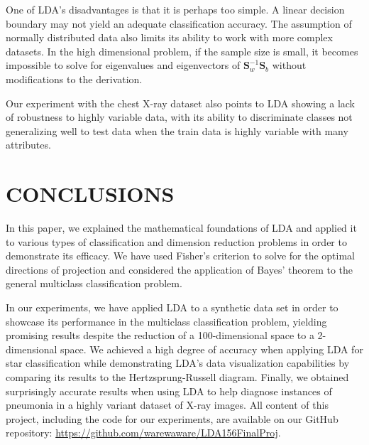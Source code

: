\documentclass[letterpaper, 10 pt, conference]{ieeeconf}  %
\newcommand{\ve}[1]{\mathbf{#1}}
\begin{document}
One of LDA's disadvantages is that it is perhaps too simple. A linear decision boundary may not yield an adequate classification accuracy. The assumption of normally distributed data also limits its ability to work with more complex datasets. In the high dimensional problem, if the sample size is small, it becomes impossible to solve for eigenvalues and eigenvectors of $\ve{S}_w^{-1}\ve{S}_b$ without modifications to the derivation.

Our experiment with the chest X-ray dataset also points to LDA showing a lack of robustness to highly variable data, with its ability to discriminate classes not generalizing well to test data when the train data is highly variable with many attributes.

\section{CONCLUSIONS}\label{sec:conclusions}
In this paper, we explained the mathematical foundations of LDA and applied it to various types of classification and dimension reduction problems in order to demonstrate its efficacy. We have used Fisher's criterion to solve for the optimal directions of projection and considered the application of Bayes' theorem to the general multiclass classification problem.

In our experiments, we have applied LDA to a synthetic data set in order to showcase its performance in the multiclass classification problem, yielding promising results despite the reduction of a 100-dimensional space to a 2-dimensional space. We achieved a high degree of accuracy when applying LDA for star classification while demonstrating LDA's data visualization capabilities by comparing its results to the Hertzsprung-Russell diagram. Finally, we obtained surprisingly accurate results when using LDA to help diagnose instances of pneumonia in a highly variant dataset of X-ray images.
All content of this project, including the code for our experiments, are available on our GitHub repository: \url{https://github.com/warewaware/LDA156FinalProj}.
\printbibliography


\addtolength{\textheight}{-12cm}   %
\end{document}
